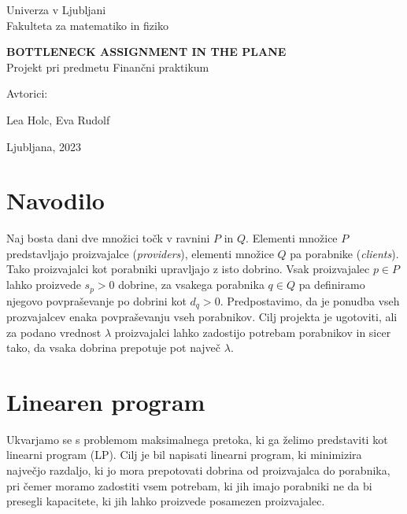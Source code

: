 \documentclass[a4paper, 11pt]{article}
\begin{document}
\thispagestyle{empty}
\begin{center}
\begin{minipage}{0.75\linewidth}
    \centering
    {\Large Univerza v Ljubljani \\ Fakulteta za matematiko in fiziko}
    \\
    \vspace{7cm}

    {\uppercase{\LARGE \textbf{Bottleneck assignment in the plane}}} \\ Projekt pri predmetu Finančni praktikum \\
    \vspace{3cm}

    Avtorici:\\
    {\Large Lea Holc, Eva Rudolf\par}
    \vspace{7cm}

    {\Large Ljubljana, 2023}
\end{minipage}
\end{center}


\newpage
\tableofcontents
\newpage

\section{Navodilo}
Naj bosta dani dve množici točk v ravnini $P$ in $Q$. Elementi množice $P$ predstavljajo proizvajalce 
(\textsl{providers}), elementi množice $Q$ pa porabnike (\textsl{clients}). Tako proizvajalci kot porabniki 
upravljajo z isto dobrino. Vsak proizvajalec $p \in P$ lahko proizvede $s_p > 0$ dobrine, za vsakega porabnika 
$q \in Q$ pa definiramo njegovo povpraševanje po dobrini kot $d_q > 0$. Predpostavimo, da je ponudba vseh 
prozvajalcev enaka povpraševanju vseh porabnikov. Cilj projekta je ugotoviti, ali za podano vrednost $\lambda$ 
proizvajalci lahko zadostijo potrebam porabnikov in sicer tako, da vsaka dobrina prepotuje pot največ $\lambda$. 

\section{Linearen program}
Ukvarjamo se s problemom maksimalnega pretoka, ki ga želimo predstaviti kot linearni program (LP).
Cilj je bil napisati linearni program, ki minimizira največjo razdaljo, ki jo mora prepotovati dobrina 
od proizvajalca do porabnika, pri čemer moramo zadostiti vsem potrebam, ki jih imajo porabniki ne da 
bi presegli kapacitete, ki jih lahko proizvede posamezen proizvajalec. 
\end{document}
